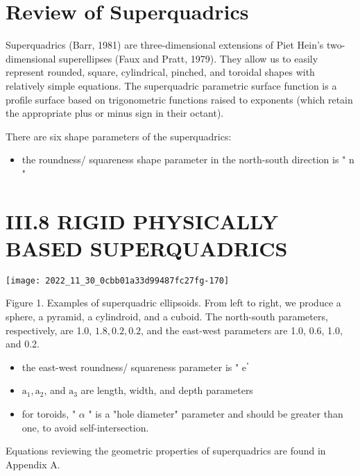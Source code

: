 \section{Review of Superquadrics}
Superquadrics (Barr, 1981) are three-dimensional extensions of Piet Hein's two-dimensional superellipses (Faux and Pratt, 1979). They allow us to easily represent rounded, square, cylindrical, pinched, and toroidal shapes with relatively simple equations. The superquadric parametric surface function is a profile surface based on trigonometric functions raised to exponents (which retain the appropriate plus or minus sign in their octant).

There are six shape parameters of the superquadrics:

\begin{itemize}
  \item the roundness/ squareness shape parameter in the north-south direction is " $\mathrm{n}$ "
\end{itemize}

\section{III.8 RIGID PHYSICALLY BASED SUPERQUADRICS}
\begin{center}
\texttt{[image: 2022\_11\_30\_0cbb01a33d99487fc27fg-170]}
\end{center}

Figure 1. Examples of superquadric ellipsoids. From left to right, we produce a sphere, a pyramid, a cylindroid, and a cuboid. The north-south parameters, respectively, are 1.0, $1.8,0.2,0.2$, and the east-west parameters are 1.0, 0.6, 1.0, and 0.2.

\begin{itemize}
  \item the east-west roundness/ squareness parameter is " $\mathrm{e}^{\text {" }}$

  \item $\mathrm{a}_{1}, \mathrm{a}_{2}$, and $\mathrm{a}_{3}$ are length, width, and depth parameters

  \item for toroids, " $\alpha$ " is a "hole diameter" parameter and should be greater than one, to avoid self-intersection.

\end{itemize}

Equations reviewing the geometric properties of superquadrics are found in Appendix A.

